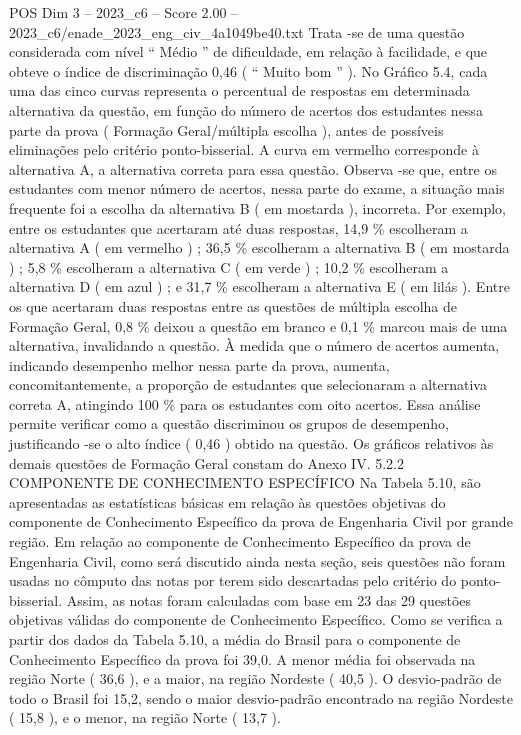 \begin{textsample}{POS Dim 3 – 2023\_c6 – Score 2.00 – 2023\_c6/enade\_2023\_eng\_civ\_4a1049be40.txt}
Trata -se de uma questão considerada com nível “ Médio ” de dificuldade, em relação à facilidade, e que obteve o índice de discriminação 0,46 ( “ Muito bom ” ).
No Gráfico 5.4, cada uma das cinco curvas representa o percentual de respostas em determinada alternativa da questão, em função do número de acertos dos estudantes nessa parte da prova ( Formação Geral/múltipla escolha ), antes de possíveis eliminações pelo critério ponto-bisserial.
A curva em vermelho corresponde à alternativa A, a alternativa correta para essa questão.
Observa -se que, entre os estudantes com menor número de acertos, nessa parte do exame, a situação mais frequente foi a escolha da alternativa B ( em mostarda ), incorreta.
Por exemplo, entre os estudantes que acertaram até duas respostas, 14,9 \% escolheram a alternativa A ( em vermelho ) ; 36,5 \% escolheram a alternativa B ( em mostarda ) ; 5,8 \% escolheram a alternativa C ( em verde ) ; 10,2 \% escolheram a alternativa D ( em azul ) ; e 31,7 \% escolheram a alternativa E ( em lilás ).
Entre os que acertaram duas respostas entre as questões de múltipla escolha de Formação Geral, 0,8 \% deixou a questão em branco e 0,1 \% marcou mais de uma alternativa, invalidando a questão.
À medida que o número de acertos aumenta, indicando desempenho melhor nessa parte da prova, aumenta, concomitantemente, a proporção de estudantes que selecionaram a alternativa correta A, atingindo 100 \% para os estudantes com oito acertos.
Essa análise permite verificar como a questão discriminou os grupos de desempenho, justificando -se o alto índice ( 0,46 ) obtido na questão.
Os gráficos relativos às demais questões de Formação Geral constam do Anexo IV. 5.2.2 COMPONENTE DE CONHECIMENTO ESPECÍFICO Na Tabela 5.10, são apresentadas as estatísticas básicas em relação às questões objetivas do componente de Conhecimento Específico da prova de Engenharia Civil por grande região.
Em relação ao componente de Conhecimento Específico da prova de Engenharia Civil, como será discutido ainda nesta seção, seis questões não foram usadas no cômputo das notas por terem sido descartadas pelo critério do ponto-bisserial.
Assim, as notas foram calculadas com base em 23 das 29 questões objetivas válidas do componente de Conhecimento Específico.
Como se verifica a partir dos dados da Tabela 5.10, a média do Brasil para o componente de Conhecimento Específico da prova foi 39,0.
A menor média foi observada na região Norte ( 36,6 ), e a maior, na região Nordeste ( 40,5 ).
O desvio-padrão de todo o Brasil foi 15,2, sendo o maior desvio-padrão encontrado na região Nordeste ( 15,8 ), e o menor, na região Norte ( 13,7 ).

\end{textsample}
